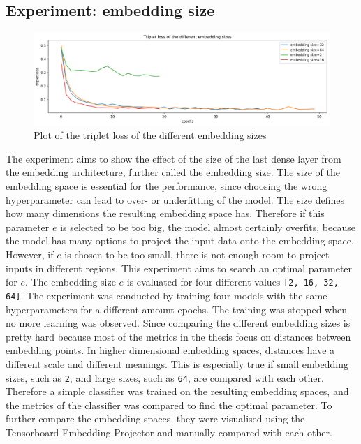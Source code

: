 \subsection{Experiment: embedding size}
\label{sub:Experiment-Embedding-Size}
\begin{figure}[htb]
\centering
    \includegraphics[width=0.95\linewidth]{img/experiment_embedding_space_triplet_loss_all.png}
    \caption{Plot of the triplet loss of the different embedding sizes}
    \label{fig:plot-embeddings-epochs}
\end{figure}
\noindent
The experiment aims to show the effect of the size of the last dense layer from the embedding architecture, further called the embedding size. The size of the embedding space is essential for the performance, since choosing the wrong hyperparameter can lead to over- or underfitting of the model. The size defines how many dimensions the resulting embedding space has. Therefore if this parameter $e$ is selected to be too big, the model almost certainly overfits, because the model has many options to project the input data onto the embedding space. However, if $e$ is chosen to be too small, there is not enough room to project inputs in different regions. This experiment aims to search an optimal parameter for $e$. The embedding size $e$ is evaluated for four different values \texttt{[2, 16, 32, 64]}.
\newline
\newline
The experiment was conducted by training four models with the same hyperparameters for a different amount epochs. The training was stopped when no more learning was observed. Since comparing the different embedding sizes is pretty hard because most of the metrics in the thesis focus on distances between embedding points. In higher dimensional embedding spaces, distances have a different scale and different meanings. This is especially true if small embedding sizes, such as \texttt{2}, and large sizes, such as \texttt{64}, are compared with each other. Therefore a simple classifier was trained on the resulting embedding spaces, and the metrics of the classifier was compared to find the optimal parameter. To further compare the embedding spaces, they were visualised using the Tensorboard Embedding Projector and manually compared with each other.
